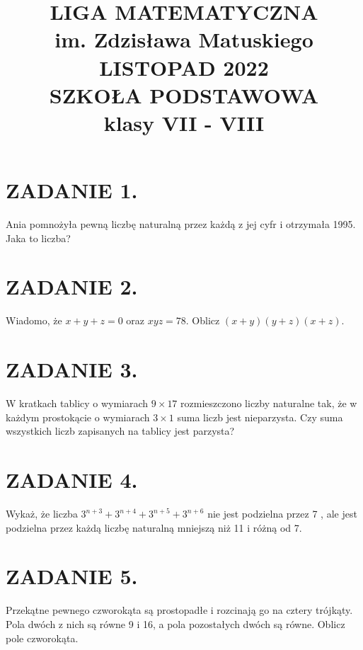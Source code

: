 \documentclass[10pt]{article}
\title{LIGA MATEMATYCZNA \\
 im. Zdzisława Matuskiego \\
 LISTOPAD 2022 \\
 SZKOŁA PODSTAWOWA \\
 klasy VII - VIII }
\author{}
\date{}
\begin{document}
\maketitle
\section*{ZADANIE 1.}
Ania pomnożyła pewną liczbę naturalną przez każdą z jej cyfr i otrzymała 1995. Jaka to liczba?

\section*{ZADANIE 2.}
Wiadomo, że \(x+y+z=0\) oraz \(x y z=78\). Oblicz \((x+y)(y+z)(x+z)\).

\section*{ZADANIE 3.}
W kratkach tablicy o wymiarach \(9 \times 17\) rozmieszczono liczby naturalne tak, że w każdym prostokącie o wymiarach \(3 \times 1\) suma liczb jest nieparzysta. Czy suma wszystkich liczb zapisanych na tablicy jest parzysta?

\section*{ZADANIE 4.}
Wykaż, że liczba \(3^{n+3}+3^{n+4}+3^{n+5}+3^{n+6}\) nie jest podzielna przez 7 , ale jest podzielna przez każdą liczbę naturalną mniejszą niż 11 i różną od 7.

\section*{ZADANIE 5.}
Przekątne pewnego czworokąta są prostopadłe i rozcinają go na cztery trójkąty. Pola dwóch z nich są równe 9 i 16, a pola pozostałych dwóch są równe. Oblicz pole czworokąta.
\end{document}
